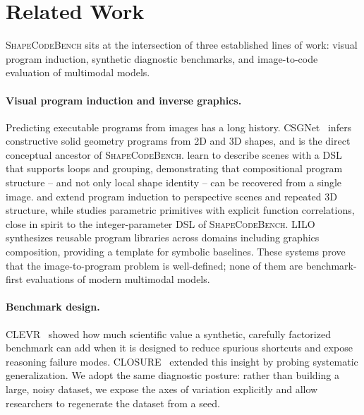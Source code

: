 \section{Related Work}
\label{sec:related}

\textsc{ShapeCodeBench} sits at the intersection of three established lines of work:
visual program induction, synthetic diagnostic benchmarks, and image-to-code
evaluation of multimodal models.

\paragraph{Visual program induction and inverse graphics.}
Predicting executable programs from images has a long history. CSGNet~\cite{sharma2018csgnet}
infers constructive solid geometry programs from 2D and 3D shapes, and is the
direct conceptual ancestor of \textsc{ShapeCodeBench}. \cite{liu2019scenes} learn to
describe scenes with a DSL that supports loops and grouping, demonstrating that
compositional program structure -- and not only local shape identity -- can be
recovered from a single image. \cite{li2020perspective} and
\cite{li2020multiplane} extend program induction to perspective scenes and
repeated 3D structure, while \cite{duan2022parametric} studies parametric
primitives with explicit function correlations, close in spirit to the
integer-parameter DSL of \textsc{ShapeCodeBench}. LILO~\cite{grand2024lilo} synthesizes
reusable program libraries across domains including graphics composition,
providing a template for symbolic baselines. These systems prove that the
image-to-program problem is well-defined; none of them are benchmark-first
evaluations of modern multimodal models.

\paragraph{Benchmark design.}
\textsc{CLEVR}~\cite{johnson2017clevr} showed how much scientific value a
synthetic, carefully factorized benchmark can add when it is designed to reduce
spurious shortcuts and expose reasoning failure modes.
\textsc{CLOSURE}~\cite{bahdanau2019closure} extended this insight by probing
systematic generalization. We adopt the same diagnostic posture: rather than
building a large, noisy dataset, we expose the axes of variation explicitly and
allow researchers to regenerate the dataset from a seed.

